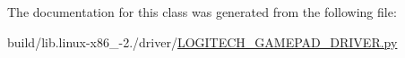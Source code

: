 The documentation for this class was generated from the following file\+:\begin{DoxyCompactItemize}
\item 
build/lib.\+linux-\/x86\+\_-\/2./driver/\hyperlink{build_2lib_8linux-x86__64-2_87_2driver_2LOGITECH__GAMEPAD__DRIVER_8py}{L\+O\+G\+I\+T\+E\+C\+H\+\_\+\+G\+A\+M\+E\+P\+A\+D\+\_\+\+D\+R\+I\+V\+E\+R.\+py}\end{DoxyCompactItemize}
